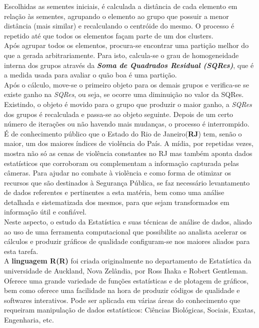 \documentclass[a4paper, 12pt]{article}
\begin{document}
\begin{multicols}{2}
		Escolhidas as sementes iniciais, é calculada a distância de cada elemento em relação às sementes, agrupando o elemento ao grupo que possuir a menor distância (mais similar) e recalculando o centróide do mesmo. O processo é repetido até que todos os elementos façam parte de um dos clusters.\\
		
		Após agrupar todos os elementos, procura-se encontrar uma partição melhor do que a gerada arbitrariamente. Para isto, calcula-se o grau de homogeneidade interna dos grupos através da \textit{\textbf{Soma de Quadrados Residual (SQRes)}}, que é a medida usada para avaliar o quão boa é uma partição.\\
		
		Após o cálculo, move-se o primeiro objeto para os demais grupos e verifica-se se existe ganho na \textit{SQRes}, ou seja, se ocorre uma diminuição no valor da SQRes. Existindo, o objeto é movido para o grupo que produzir o maior ganho, a \textit{SQRes} dos grupos é recalculada e passa-se ao objeto seguinte. Depois de um certo número de iterações ou não havendo mais mudanças, o processo é interrompido.\\
				
		
		É de conhecimento público que o Estado do Rio de Janeiro(\textbf{RJ}) tem, senão o maior, um dos maiores índices de violência do País.  A mídia, por repetidas vezes, mostra não só as cenas de violência constantes no RJ mas também aponta dados estatísticos que corroboram ou complementam a informação capturada pelas câmeras.   Para ajudar no combate à violência e como forma de otimizar os recursos que são destinados à Segurança Pública, se faz necessário levantamento de dados referentes e pertinentes a esta matéria, bem como uma análise detalhada e sistematizada dos mesmos, para que sejam transformados em informação útil e confiável.\\
		
		Neste aspecto, o estudo da Estatística e suas técnicas de análise de dados, aliado ao uso de uma ferramenta computacional que possibilite ao analista acelerar os cálculos e produzir gráficos de qualidade configuram-se nos maiores aliados para esta tarefa.\\
		
		A \textbf{linguagem R(R)} foi criada originalmente no departamento de Estatística da universidade de Auckland, Nova Zelândia, por Ross Ihaka e Robert Gentleman.  Oferece uma grande variedade de funções estatísticas e de plotagem de gráficos, bem como oferece uma facilidade na hora de produzir códigos de qualidade e softwares interativos.  Pode ser aplicada em várias áreas do conhecimento que requeiram manipulação de dados estatísticos:  Ciências Biológicas, Sociais, Exatas, Engenharia, etc. 
		

\end{multicols}
\end{document}
